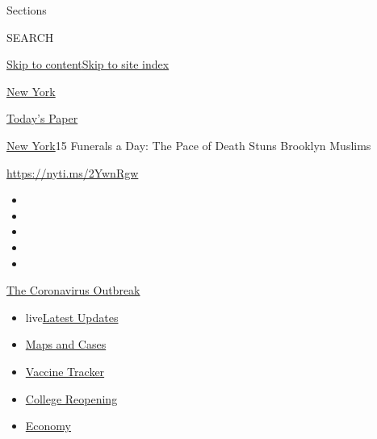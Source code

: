 Sections

SEARCH

\protect\hyperlink{site-content}{Skip to
content}\protect\hyperlink{site-index}{Skip to site index}

\href{https://www.nytimes.com/section/nyregion}{New York}

\href{https://myaccount.nytimes.com/auth/login?response_type=cookie\&client_id=vi}{}

\href{https://www.nytimes.com/section/todayspaper}{Today's Paper}

\href{/section/nyregion}{New York}\textbar{}15 Funerals a Day: The Pace
of Death Stuns Brooklyn Muslims

\url{https://nyti.ms/2YwnRgw}

\begin{itemize}
\item
\item
\item
\item
\item
\end{itemize}

\href{https://www.nytimes.com/news-event/coronavirus?action=click\&pgtype=Article\&state=default\&region=TOP_BANNER\&context=storylines_menu}{The
Coronavirus Outbreak}

\begin{itemize}
\tightlist
\item
  live\href{https://www.nytimes.com/2020/08/04/world/coronavirus-covid-19.html?action=click\&pgtype=Article\&state=default\&region=TOP_BANNER\&context=storylines_menu}{Latest
  Updates}
\item
  \href{https://www.nytimes.com/interactive/2020/us/coronavirus-us-cases.html?action=click\&pgtype=Article\&state=default\&region=TOP_BANNER\&context=storylines_menu}{Maps
  and Cases}
\item
  \href{https://www.nytimes.com/interactive/2020/science/coronavirus-vaccine-tracker.html?action=click\&pgtype=Article\&state=default\&region=TOP_BANNER\&context=storylines_menu}{Vaccine
  Tracker}
\item
  \href{https://www.nytimes.com/2020/08/02/us/covid-college-reopening.html?action=click\&pgtype=Article\&state=default\&region=TOP_BANNER\&context=storylines_menu}{College
  Reopening}
\item
  \href{https://www.nytimes.com/live/2020/08/03/business/stock-market-today-coronavirus?action=click\&pgtype=Article\&state=default\&region=TOP_BANNER\&context=storylines_menu}{Economy}
\end{itemize}

